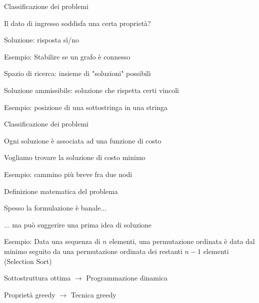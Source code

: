 \begin{frame}{Classificazione dei problemi}

\vspace{-9pt}
\begin{myboxtitle}
\BIL
\item Il dato di ingresso soddisfa una certa proprietà?
\item Soluzione: risposta sì/no
\item Esempio: Stabilire se un grafo è connesso
\EIL
\end{myboxtitle}
\begin{myboxtitle}
\BIL
\item Spazio di ricerca: insieme di "soluzioni" possibili
\item Soluzione ammissibile: soluzione che rispetta certi vincoli
\item Esempio: posizione di una sottostringa in una stringa
\EIL
\end{myboxtitle}

\end{frame}

\begin{frame}{Classificazione dei problemi}

\vspace{-9pt}
\begin{myboxtitle}
\BIL
\item Ogni soluzione è associata ad una funzione di costo
\item Vogliamo trovare la soluzione di costo minimo
\item Esempio: cammino più breve fra due nodi
\EIL
\end{myboxtitle}

\end{frame}

\begin{frame}{Definizione matematica del problema}

\vspace{-9pt}
	\BIL
	\item Spesso la formulazione è banale...
	\item ... ma può suggerire una prima idea di soluzione
	\item Esempio: Data una sequenza di $n$ elementi, una permutazione ordinata 
	è data dal minimo seguito da una permutazione ordinata dei restanti $n-1$ elementi
	(Selection Sort)
	\EIL
	
\medskip
{}
	\BIL
	\item \alert{Sottostruttura ottima} $\rightarrow$ \alert{Programmazione dinamica}
	\item \alert{Proprietà greedy} $\rightarrow$ \alert{Tecnica greedy}
	\EIL
    
\end{frame}


